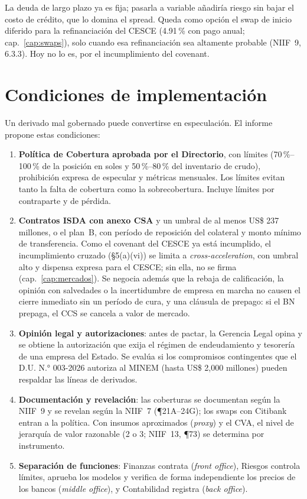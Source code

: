 La deuda de largo plazo ya es fija; pasarla a variable añadiría riesgo sin bajar el costo de crédito, que lo domina el spread. Queda como opción el swap de inicio diferido para la refinanciación del CESCE (4.91\,\% con pago anual; cap.~\ref{cap:swaps}), solo cuando esa refinanciación sea altamente probable (NIIF~9, 6.3.3). Hoy no lo es, por el incumplimiento del covenant.

\section{Condiciones de implementación}

Un derivado mal gobernado puede convertirse en especulación. El informe propone estas condiciones:

\begin{enumerate}
\item \textbf{Política de Cobertura aprobada por el Directorio}, con límites (70\,\%--100\,\% de la posición en soles y 50\,\%--80\,\% del inventario de crudo), prohibición expresa de especular y métricas mensuales. Los límites evitan tanto la falta de cobertura como la sobrecobertura. Incluye límites por contraparte y de pérdida.
\item \textbf{Contratos ISDA con anexo CSA} y un umbral de al menos US\$ 237 millones, o el plan~B, con período de reposición del colateral y monto mínimo de transferencia. Como el covenant del CESCE ya está incumplido, el incumplimiento cruzado (§5(a)(vi)) se limita a \emph{cross-acceleration}, con umbral alto y dispensa expresa para el CESCE; sin ella, no se firma (cap.~\ref{cap:mercados}). Se negocia además que la rebaja de calificación, la opinión con salvedades o la incertidumbre de empresa en marcha no causen el cierre inmediato sin un período de cura, y una cláusula de prepago: si el BN prepaga, el CCS se cancela a valor de mercado.
\item \textbf{Opinión legal y autorizaciones}: antes de pactar, la Gerencia Legal opina y se obtiene la autorización que exija el régimen de endeudamiento y tesorería de una empresa del Estado. Se evalúa si los compromisos contingentes que el D.U. N.° 003-2026 autoriza al MINEM (hasta US\$ 2,000 millones) pueden respaldar las líneas de derivados.
\item \textbf{Documentación y revelación}: las coberturas se documentan según la NIIF~9 y se revelan según la NIIF~7 (¶21A--24G); los swaps con Citibank entran a la política. Con insumos aproximados (\emph{proxy}) y el CVA, el nivel de jerarquía de valor razonable (2 o 3; NIIF~13, ¶73) se determina por instrumento.
\item \textbf{Separación de funciones}: Finanzas contrata (\emph{front office}), Riesgos controla límites, aprueba los modelos y verifica de forma independiente los precios de los bancos (\emph{middle office}), y Contabilidad registra (\emph{back office}).
\end{enumerate}

